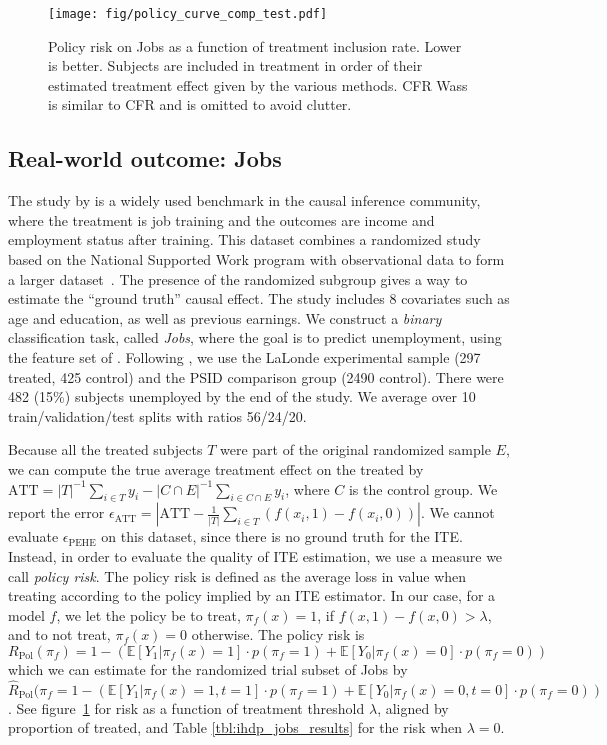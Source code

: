 \documentclass{article}
\def \epehe{\epsilon_{\text{PEHE}}}
\def \eatt{\epsilon_{\text{ATT}}}
\begin{document}
\begin{figure}[t]
  \centering
  \texttt{[image: fig/policy\_curve\_comp\_test.pdf]}\vspace{-0.5em}
  \caption{\label{fig:policy_curve}Policy risk on Jobs as a function of treatment inclusion rate. Lower is better. Subjects are included in treatment in order of their estimated treatment effect given by the various methods. CFR Wass is similar to CFR and is omitted to avoid clutter. }
  \vspace{-1.2em}
\end{figure}

\subsection{Real-world outcome: Jobs}
\label{sec:nsw}
The study by \citet{lalonde1986evaluating} is a widely used benchmark in the causal inference community, where the treatment is job training and the outcomes are income and employment status after training. This dataset combines a randomized study based on the National Supported Work program with observational data to form a larger dataset~\citep{smith2005does}. The presence of the randomized subgroup gives a way to estimate the ``ground truth'' causal effect. The study includes 8 covariates such as age and education, as well as previous earnings. We construct a \emph{binary} classification task, called \emph{Jobs}, where the goal is to predict unemployment, using the feature set of \citet{dehejia2002propensity}. Following \citet{smith2005does}, we use the LaLonde experimental sample (297 treated, 425 control) and the PSID comparison group (2490 control). There were 482 (15\%) subjects unemployed by the end of the study. We average over 10 train/validation/test splits with ratios 56/24/20.

Because all the treated subjects $T$ were part of the original randomized sample $E$, we can compute the true average treatment effect on the treated by $\text{ATT} = {|T|}^{-1}\sum_{i \in T} y_i - {|C \cap E|}^{-1}\sum_{i \in C \cap E} y_i$, where $C$ is the control group. We report the error $\eatt = | \text{ATT} - \frac{1}{|T|}\sum_{i\in T} (f(x_i, 1) - f(x_i, 0))|$.
We cannot evaluate $\epehe$ on this dataset, since there is no ground truth for the ITE. Instead, in order to evaluate the quality of ITE estimation, we use a measure we call \emph{policy risk}. The policy risk is defined as the average loss in value when treating according to the policy implied by an ITE estimator. In our case, for a model $f$, we let the policy be to treat, $\pi_f(x) = 1$, if $f(x,1) - f(x,0) > \lambda$, and to not treat, $\pi_f(x) = 0$ otherwise. The policy risk is $R_{\text{Pol}}(\pi_f) = 1 - (\mathbb{E}[Y_1|\pi_f(x)=1]\cdot p(\pi_f=1) + \mathbb{E}[Y_0|\pi_f(x)=0]\cdot p(\pi_f=0))$ which we can estimate for the randomized trial subset of Jobs by $\hat{R}_{\text{Pol}}(\pi_f = 1 - (\mathbb{E}[Y_1|\pi_f(x)=1, t=1]\cdot p(\pi_f=1) + \mathbb{E}[Y_0|\pi_f(x)=0, t=0]\cdot p(\pi_f=0))$. See figure~\ref{fig:policy_curve} for risk as a function of treatment threshold $\lambda$, aligned by proportion of treated, and Table \ref{tbl:ihdp_jobs_results} for the risk when $\lambda=0$.
\vskip -5pt
\end{document}

